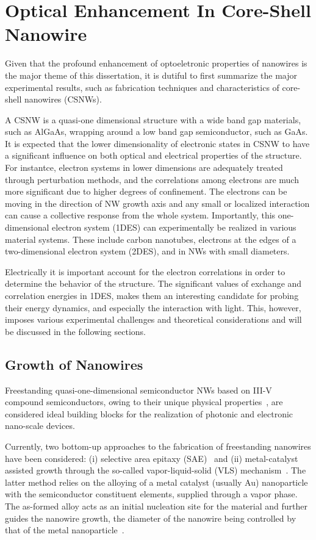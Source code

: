 \chapter[Optical Enhancement]{Optical Enhancement In Core-Shell Nanowire}
\label{data}

Given that the profound enhancement of optoeletronic properties of nanowires is
the major theme of this dissertation, it is dutiful to first summarize the
major experimental results, such as fabrication techniques and characteristics
of core-shell nanowires (CSNWs).

A CSNW is a quasi-one dimensional structure with a wide band gap materials,
such as AlGaAs, wrapping around a low band gap semiconductor, such as GaAs. It
is expected that the lower dimensionality of electronic states in CSNW to have
a significant influence on both optical and electrical properties of the
structure. For instantce, electron systems in lower dimensions are adequately
treated through perturbation methods, and the correlations among electrons are
much more significant due to higher degrees of confinement. The electrons can
be moving in the direction of NW growth axis and any small or localized
interaction can cause a collective response from the whole system. Importantly,
this one-dimensional electron system (1DES) can experimentally be realized in
various material systems. These include carbon nanotubes, electrons at the
edges of a two-dimensional electron system (2DES), and in NWs with small
diameters.

Electrically it is important account for the electron correlations in order to
determine the behavior of the structure. The significant values of exchange and
correlation energies in 1DES, makes them an interesting candidate for probing
their energy dynamics, and especially the interaction with light. This,
however, imposes various experimental challenges and theoretical considerations
and will be discussed in the following sections.

\section{Growth of Nanowires}

Freestanding quasi-one-dimensional semiconductor NWs based on III-V compound
semiconductors, owing to their unique physical
properties~\cite{huang2002gallium,Law:2004gl}, are considered ideal building
blocks for the realization of photonic and electronic nano-scale devices.

Currently, two bottom-up approaches to the fabrication of freestanding
nanowires have been considered: (i) selective area epitaxy
(SAE)~\cite{motohisa2004catalyst} and (ii) metal-catalyst assisted growth
through the so-called vapor-liquid-solid (VLS) mechanism~\cite{wagner1964vapor,
givargizov1975fundamental}. The latter method relies on the alloying of a metal
catalyst (usually Au) nanoparticle with the semiconductor constituent elements,
supplied through a vapor phase. The as-formed alloy acts as an initial
nucleation site for the material and further guides the nanowire growth, the
diameter of the nanowire being controlled by that of the metal
nanoparticle~\cite{cui2001diameter}.

